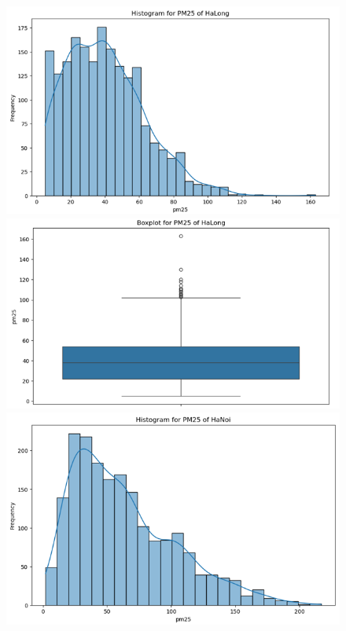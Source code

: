 \begin{figure}[H]
  \centering
  \begin{minipage}{0.15\textwidth}
  \centering
  \end{minipage}
  \hfill

  \begin{minipage}{0.15\textwidth}
      \centering
      \includegraphics[width=1\textwidth]{img/final/Dataset/histogram.png}
      \end{minipage}
      \hfill
      \begin{minipage}{0.15\textwidth}
      \centering
      \includegraphics[width=1\textwidth]{img/final/Dataset/boxplot.png}
      \end{minipage}
      \hfill
      \begin{minipage}{0.15\textwidth}
      \centering
      \includegraphics[width=1\textwidth]{img/final/Dataset/histogram_hn.png}
      \end{minipage}
      \hfill


\end{figure}
